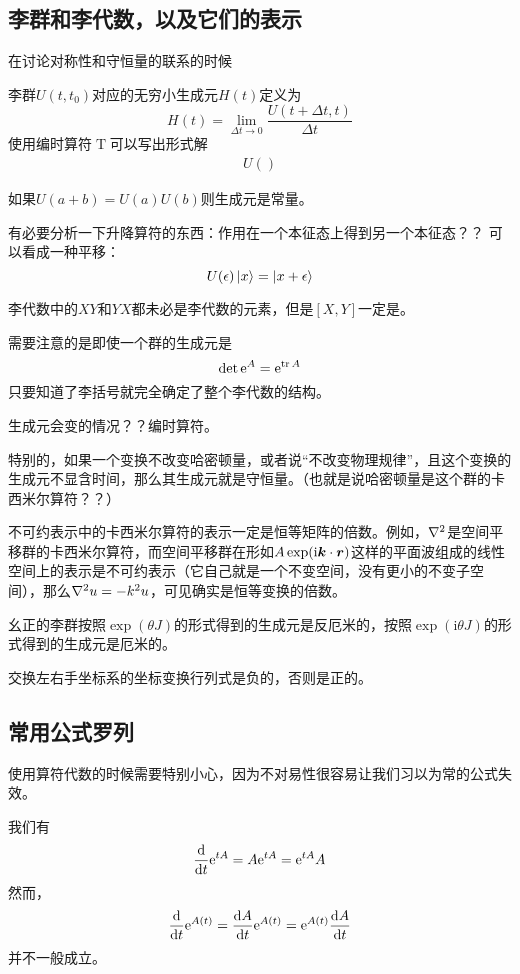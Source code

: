 \documentclass[UTF8, a4paper]{ctexart}
\DeclareMathOperator{\timeorder}{T}
\newcommand*{\ii}{\mathrm{i}}
\newcommand*{\ee}{\mathrm{e}}
\begin{document}
\subsection{李群和李代数，以及它们的表示}
在讨论对称性和守恒量的联系的时候

李群$U(t,t_0)$对应的无穷小生成元$H(t)$定义为
\begin{equation}
    H(t) = \lim_{\Delta t \to 0} \frac{U(t+\Delta t, t)}{\Delta t}
\end{equation}
使用编时算符$\timeorder$可以写出形式解
\begin{eqnarray}
    U()
\end{eqnarray}

如果$U(a+b)=U(a)U(b)$则生成元是常量。

有必要分析一下升降算符的东西：作用在一个本征态上得到另一个本征态？？
可以看成一种平移：
\[
    U(\epsilon) \ket{x} = \ket{x + \epsilon}
\]

李代数中的$XY$和$YX$都未必是李代数的元素，但是$[X,Y]$一定是。

需要注意的是即使一个群的生成元是
\[
    \det \ee^{A} = \ee^{\trace A}
\]
只要知道了李括号就完全确定了整个李代数的结构。

生成元会变的情况？？编时算符。

特别的，如果一个变换不改变哈密顿量，或者说“不改变物理规律”，且这个变换的生成元不显含时间，那么其生成元就是守恒量。（也就是说哈密顿量是这个群的卡西米尔算符？？）

不可约表示中的卡西米尔算符的表示一定是恒等矩阵的倍数。例如，$\laplacian$是空间平移群的卡西米尔算符，而空间平移群在形如$A\exp (\ii \vb*{k} \cdot \vb*{r})$这样的平面波组成的线性空间上的表示是不可约表示（它自己就是一个不变空间，没有更小的不变子空间），那么$\laplacian u = - k^2 u$，可见确实是恒等变换的倍数。

幺正的李群按照$\exp(\theta J)$的形式得到的生成元是反厄米的，按照$\exp(\ii \theta J)$的形式得到的生成元是厄米的。

交换左右手坐标系的坐标变换行列式是负的，否则是正的。

\subsection{常用公式罗列}

使用算符代数的时候需要特别小心，因为不对易性很容易让我们习以为常的公式失效。


我们有
\[
    \dv{t} \ee^{t A} = A \ee^{t A} = \ee^{t A} A
\]
然而，
\[
    \dv{t} \ee^{A(t)} = \dv{A}{t} \ee^{A(t)} = \ee^{A(t)} \dv{A}{t}
\]
并不一般成立。
\end{document}
